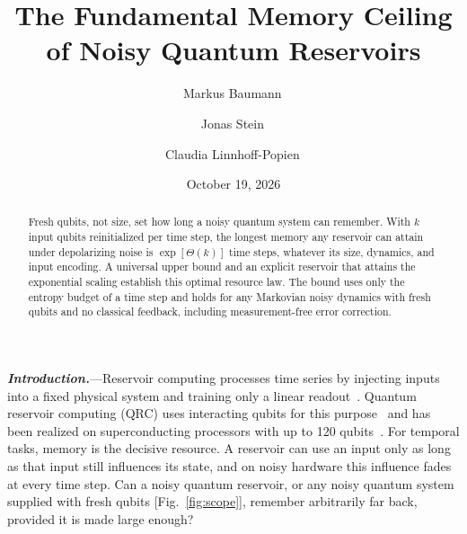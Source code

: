 \documentclass[aps,prl,twocolumn,superscriptaddress,floatfix]{revtex4-2}
\theoremstyle{plain}
\newcommand{\runin}[1]{\textit{\textbf{#1}}---}
\begin{document}
\let\SMaddcontentsline\addcontentsline
\renewcommand{\addcontentsline}[3]{}

\title{The Fundamental Memory Ceiling of Noisy Quantum Reservoirs}

\author{Markus Baumann\,}
\author{Jonas Stein\,}
\author{Claudia Linnhoff-Popien\,}

\date{October 19, 2026}

\begin{abstract}
Fresh qubits, not size, set how long a noisy quantum system can remember. With $k$ input qubits reinitialized per time step, the longest memory any reservoir can attain under depolarizing noise is $\exp[\Theta(k)]$ time steps, whatever its size, dynamics, and input encoding. A universal upper bound and an explicit reservoir that attains the exponential scaling establish this optimal resource law. The bound uses only the entropy budget of a time step and holds for any Markovian noisy dynamics with fresh qubits and no classical feedback, including measurement-free error correction.
\end{abstract}

\maketitle


\runin{Introduction.}Reservoir computing processes time series by injecting inputs into a fixed physical system and training only a linear readout~\cite{Jaeger2001,Maass2002,JaegerHaas2004,Lukosevicius2009,Tanaka2019}. Quantum reservoir computing (QRC) uses interacting qubits for this purpose~\cite{Fujii2017,Nakajima2019,Mujal2021} and has been realized on superconducting processors with up to 120 qubits~\cite{Chen2020,Suzuki2022,Yasuda2023,Hu2024,Monzani2024}. For temporal tasks, memory is the decisive resource. A reservoir can use an input only as long as that input still influences its state, and on noisy hardware this influence fades at every time step. Can a noisy quantum reservoir, or any noisy quantum system supplied with fresh qubits [Fig.~\ref{fig:scope}], remember arbitrarily far back, provided it is made large enough?
\end{document}
